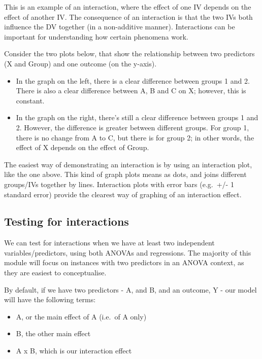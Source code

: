 \documentclass[
]{book}
\providecommand{\tightlist}{%
  \setlength{\itemsep}{0pt}\setlength{\parskip}{0pt}}
\begin{document}
This is an example of an interaction, where the effect of one IV depends on the effect of another IV. The consequence of an interaction is that the two IVs both influence the DV together (in a non-additive manner). Interactions can be important for understanding how certain phenomena work.

Consider the two plots below, that show the relationship between two predictors (X and Group) and one outcome (on the y-axis).

\begin{itemize}
\tightlist
\item
  In the graph on the left, there is a clear difference between groups 1 and 2. There is also a clear difference between A, B and C on X; however, this is constant.
\item
  In the graph on the right, there's still a clear difference between groups 1 and 2. However, the difference is greater between different groups. For group 1, there is no change from A to C, but there is for group 2; in other words, the effect of X depends on the effect of Group.
\end{itemize}



The easiest way of demonstrating an interaction is by using an interaction plot, like the one above. This kind of graph plots means as dots, and joins different groups/IVs together by lines. Interaction plots with error bars (e.g.~+/- 1 standard error) provide the clearest way of graphing of an interaction effect.

\hypertarget{testing-for-interactions}{%
\subsection{Testing for interactions}\label{testing-for-interactions}}

We can test for interactions when we have at least two independent variables/predictors, using both ANOVAs and regressions. The majority of this module will focus on instances with two predictors in an ANOVA context, as they are easiest to conceptualise.

By default, if we have two predictors - A, and B, and an outcome, Y - our model will have the following terms:

\begin{itemize}
\tightlist
\item
  A, or the main effect of A (i.e.~of A only)
\item
  B, the other main effect
\item
  A x B, which is our interaction effect
\end{itemize}
\end{document}
